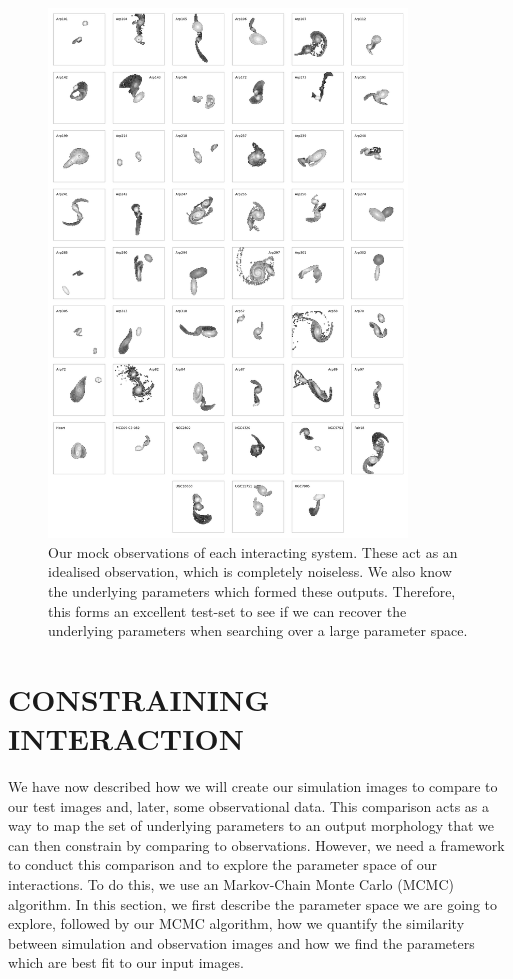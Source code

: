 \begin{figure}
    \centering
    \includegraphics[width=0.85\textwidth]{Chapter1/figures/mock-images.pdf}
    \caption[Our mock observations of each interacting system.]{Our mock observations of each interacting system. These act as an idealised observation, which is completely noiseless. We also know the underlying parameters which formed these outputs. Therefore, this forms an excellent test-set to see if we can recover the underlying parameters when searching over a large parameter space.}
    \label{fig:Obj_Cutout}
\end{figure}

\section{CONSTRAINING INTERACTION}\label{method:constraint}
We have now described how we will create our simulation images to compare to our test images and, later, some observational data. This comparison acts as a way to map the set of underlying parameters to an output morphology that we can then constrain by comparing to observations. However, we need a framework to conduct this comparison and to explore the parameter space of our interactions. To do this, we use an Markov-Chain Monte Carlo (MCMC) algorithm. In this section, we first describe the parameter space we are going to explore, followed by our MCMC algorithm, how we quantify the similarity between simulation and observation images and how we find the parameters which are best fit to our input images.

